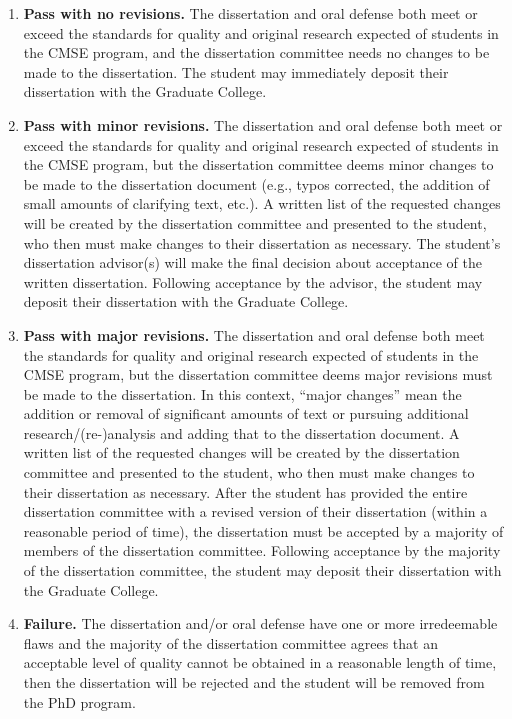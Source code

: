 \begin{enumerate}

\item \textbf{Pass with no revisions.}  The dissertation and oral
  defense both meet or exceed the standards for quality and original
  research expected of students in the CMSE program, and the dissertation
  committee needs no changes to be made to the dissertation.  The
  student may immediately deposit their dissertation with the Graduate
  College.

\item  \textbf{Pass with minor revisions.}  The dissertation and oral
  defense both meet or exceed the standards  for quality and original
  research expected of students in the CMSE program, but the dissertation
  committee deems minor changes to be made to the dissertation
  document (e.g., typos corrected, the addition of small amounts of
  clarifying text, etc.).  A written list of the requested changes
  will be created by the dissertation committee and presented to the
  student, who then must make changes to their dissertation as
  necessary.  The student's dissertation advisor(s) will make the
  final decision about acceptance of the written dissertation.
  Following acceptance by the advisor, the student may deposit their
  dissertation with the Graduate College.

\item  \textbf{Pass with major revisions.}  The dissertation and oral
  defense both meet the standards for quality and original research
  expected of students in the CMSE program, but the dissertation committee
  deems major revisions must be made to the dissertation.  In this
  context, ``major changes'' mean the addition or removal of significant
  amounts of text or pursuing additional research/(re-)analysis and
  adding that to the dissertation document.  A written list of the
  requested changes will be created by the dissertation committee and
  presented to the student, who then must make changes to their
  dissertation as necessary.  After the student has provided the
  entire dissertation committee with a revised version of their dissertation
  (within a reasonable period of time), the dissertation must be accepted by
  a majority of members of the dissertation committee.  Following acceptance
  by the majority of the dissertation committee, the student may deposit
  their dissertation with the Graduate College.

\item  \textbf{Failure.} The dissertation and/or oral defense have one
  or more irredeemable flaws and the majority of the dissertation committee
  agrees that an acceptable level of quality cannot be obtained in a
  reasonable length of time, then the dissertation will be rejected
  and the student will be removed from the PhD program.


\end{enumerate}

